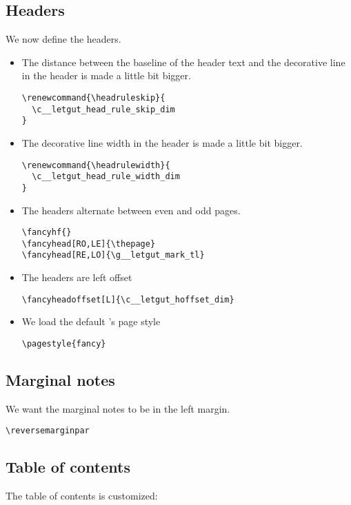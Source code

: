 \documentclass{letgut}
\begin{document}
\subsection{Headers}
\label{ImplementationHeaders-78ig55h0jlj0}
We now define the headers.

\begin{itemize}
\item The distance between the baseline of the header text and the decorative line
in the header is made a little bit bigger.
\begin{lstlisting}
\renewcommand{\headruleskip}{
  \c__letgut_head_rule_skip_dim
}
\end{lstlisting}
\item The decorative line width in the header is made a little bit bigger.
\begin{lstlisting}
\renewcommand{\headrulewidth}{
  \c__letgut_head_rule_width_dim
}
\end{lstlisting}
\item The headers alternate between even and odd pages.
\begin{lstlisting}
\fancyhf{}
\fancyhead[RO,LE]{\thepage}
\fancyhead[RE,LO]{\g__letgut_mark_tl}
\end{lstlisting}
\item The headers are left offset
\begin{lstlisting}
\fancyheadoffset[L]{\c__letgut_hoffset_dim}
\end{lstlisting}
\item We load the default 's page style
\begin{lstlisting}
\pagestyle{fancy}
\end{lstlisting}
\end{itemize}

\subsection{Marginal notes}
\label{ImplementationMarginalnotes-1uig55h0jlj0}
We want the marginal notes to be in the left margin.

\begin{lstlisting}
\reversemarginpar
\end{lstlisting}

\subsection{Table of contents}
\label{ImplementationTableofcontents-rhjg55h0jlj0}
The table of contents is customized:
\end{document}
